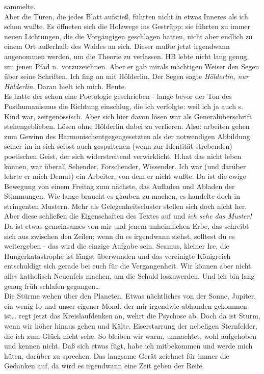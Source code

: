 \documentclass[
]{article}
\begin{document}
sammelte.\\
Aber die Türen, die jedes Blatt aufstieß, führten nicht in etwas Inneres
als ich schon wußte. Es öffneten sich die Holzwege ins Gestrüpp: sie
führten zu immer neuen Lichtungen, die die Vorgängigen geschlagen
hatten, nicht aber endlich zu einem Ort außerhalb des Waldes an sich.
Dieser mußte jetzt irgendwann angenommen werden, um die Theorie zu
verlassen. HB lebte nicht lang genug, um jenen Pfad n.~vorzuzeichnen.
Aber er gab mirals mächtigen Weiser den Segen über seine Schriften. Ich
fing an mit Hölderlin. Der Segen sagte \emph{Hölderlin, nur Hölderlin.
}Daran hielt ich mich. Heute.\\
Es hatte der schon eine Poetologie geschrieben - lange bevor der Ton des
Posthumanismus die Richtung einschlug, die ich verfolgte: weil ich ja
auch s. Kind war, zeitgenössisch. Aber sich hier davon lösen war als
Generalüberschrift stehengeblieben. Lösen ohne Hölderlin dabei zu
verlieren. Also: arbeiten gehen zum Gewinn des
Harmonischentgegengesetzten als der notwendigen Abbildung seiner im in
sich selbst auch gespaltenen (wenn zur Identität strebenden) poetischen
Geist, der sich widerstreitend verwirklicht. H.hat das nicht leben
können, war überall Sehender, Forschender, Wissender. Ich war (und
darüber lehrte er mich Demut) ein Arbeiter, von dem er nicht wußte. Da
ist die ewige Bewegung von einem Freitag zum nächste, das Aufladen und
Abladen der Stimmungen. Wie lange braucht es glauben zu machen, es
handelte doch in stringenten Mustern. Mehr als Gelegenheitscluster
stellen sich doch nicht her. Aber diese schließen die Eigenschaften des
Textes auf und \emph{ich sehe das Muster!} Da ist etwas gemeinsames von
mir und jenem unheimlichen Erbe, das schreibt sich aus zwischen den
Zeilen; wenn du es irgendwann siehst, solltest du es weitergeben - das
wird die einzige Aufgabe sein. Seamus, kleiner Ire, die
Hungerkatastrophe ist längst überwunden und das vereinigte Königreich
entschuldigt sich gerade bei euch für die Vergangenheit. Wir können aber
nicht alles katholisch Neuenfels machen, um die Schuld loszuwerden. Und
ich bin lang genug früh schlafen gegangen\ldots{}\\
Die Stürme wehen über den Planeten. Etwas nächtliches von der Sonne,
Jupiter, ein wenig Io und unser eigener Mond, der mir irgendwie abhanden
gekommen ist\ldots{} regt jetzt das Kreislaufdenken an, wehrt die
Psychose ab. Doch da ist Sturm, wenn wir höher hinaus gehen und Kälte,
Eiserstarrung der nebeligen Sternfelder, die ich zum Glück nicht sehe.
So bleiben wir warm, umnachtet, wohl aufgehoben und kennen nicht. Daß
sich etwas fügt, habe ich mitbekommen und werde mich hüten, darüber zu
sprechen. Das langsame Gerät zeichnet für immer die Gedanken auf, da
wird es irgendwann eine Zeit geben der Reife.
\end{document}
